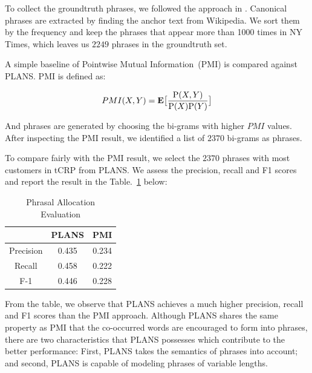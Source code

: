 To collect the groundtruth phrases, we followed the approach in
\cite{yin2014exploration}. Canonical phrases are extracted by finding the anchor
text from Wikipedia. We sort them by the frequency and keep the phrases that
appear more than 1000 times in NY Times, which leaves us $2249$ phrases in the
groundtruth set.

A simple baseline of Pointwise Mutual Information~(PMI) is compared against PLANS. PMI is defined as:

\begin{equation}
  PMI(X, Y) = \mathbf{E} \big[ \frac{\mathrm{P}(X,Y)}{\mathrm{P}(X) \mathrm{P}(Y)} \big] \label{eq::plans_pmi}
\end{equation}

And phrases are generated by choosing the bi-grams with higher $PMI$ values.
After inspecting the PMI result, we identified a list of $2370$ bi-grams as
phrases.

To compare fairly with the PMI result, we select the $2370$ phrases with most
customers in tCRP from PLANS. We assess the precision, recall and F1 scores and
report the result in the Table.~\ref{tab::plans_phrase_allocation} below:

\begin{table}[h]
  \centering
  \begin{tabular}{c|c|c}
    \hline \hline
    & PLANS & PMI \\ \hline \hline
    Precision   & 0.435 & 0.234 \\
    Recall      & 0.458 & 0.222 \\
    F-1         & 0.446 & 0.228 \\ \hline  \hline
  \end{tabular}
  \caption{Phrasal Allocation Evaluation}
  \label{tab::plans_phrase_allocation}
\end{table}

From the table, we observe that PLANS achieves a much higher precision, recall
and F1 scores than the PMI approach. Although PLANS shares the same property as
PMI that the co-occurred words are encouraged to form into phrases, there are
two characteristics that PLANS possesses which contribute to the better
performance: First, PLANS takes the semantics of phrases into account; and
second, PLANS is capable of modeling phrases of variable lengths.

